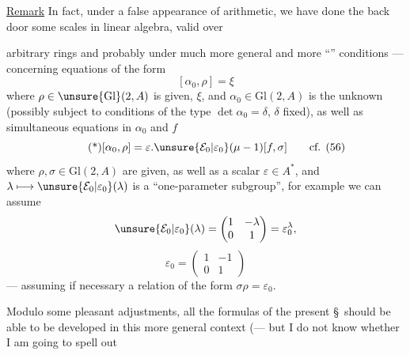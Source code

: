\uline{Remark} In fact, under a false appearance of arithmetic, we have done  the back door some scales in linear algebra, valid over



arbitrary rings and  probably under much more general and more ``'' conditions --- concerning equations of the form
\[
[\alpha_0,\rho]=\xi
\]
where $\rho\in\unsure{\mathrm{Gl}}(2,A)$ is given,  $\xi$, and
$\alpha_0\in\mathrm{Gl}(2,A)$ is the unknown (possibly subject to conditions of the type $\det\alpha_0=\delta$, $\delta$ fixed), as well as simultaneous equations in $\alpha_0$ and $f$
\[
\tag{*}
[\alpha_0,\rho]=\varepsilon.\unsure{\mathcal{E}_0|\varepsilon_0}(\mu-1)[f,\sigma]
\qquad\text{cf. (56)}
\]
where $\rho,\sigma\in\mathrm{Gl}(2,A)$ are given, as well as a scalar $\varepsilon\in A^*$, and
$\lambda\longmapsto\unsure{\mathcal{E}_0|\varepsilon_0}(\lambda)$ is a ``one-parameter subgroup'', for example we can assume
\[
\unsure{\mathcal{E}_0|\varepsilon_0}(\lambda)=\begin{pmatrix}1&-\lambda\\0&1\end{pmatrix}=\varepsilon_0^\lambda,
\]
\[
\varepsilon_0=\begin{pmatrix}1&-1\\0&1\end{pmatrix}
\]
--- assuming if necessary a relation of the form $\sigma\rho=\varepsilon_0$.

Modulo some pleasant adjustments, all the formulas of the present \S\ should be able to be developed in this more general context
(--- but I do not know whether I am going to spell out

